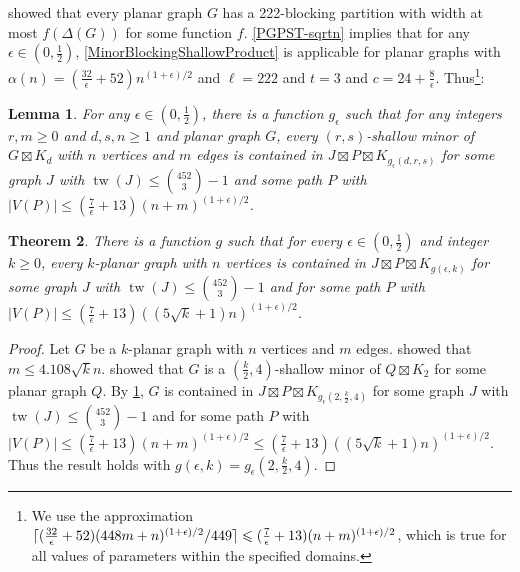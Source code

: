 \documentclass[11pt]{article}
\DeclarePairedDelimiter{\ceil}{\lceil}{\rceil}
\renewcommand{\geq}{\geqslant}
\renewcommand{\leq}{\leqslant}
\newcommand{\subsetsim}{\mathrel{\substack{\textstyle\subset\\[-0.3ex]\textstyle\sim\\[-0.4ex]}}}
\DeclareMathOperator{\tw}{tw}
\theoremstyle{plain}
\newtheorem{thm}{Theorem}
\newtheorem{lem}[thm]{Lemma}
\theoremstyle{definition}
\begin{document}

\citet[Lemma~3.1]{DHSW24} showed that every planar graph $G$ has a 222-blocking partition with width at most $f(\Delta(G))$ for some function $f$. \cref{PGPST-sqrtn} implies that for any $\epsilon\in (0,\frac12)$, \cref{MinorBlockingShallowProduct} is applicable for planar graphs with 
$\alpha(n)=(\frac{32}{\epsilon}+52) n^{(1+\epsilon)/2}$ and $\ell=222$ and $t=3$ and $c=24+\frac{8}{\epsilon}$. Thus\footnote{ We use the approximation $\ceil{ (\frac{32}{\epsilon}+52) (448m + n)^{(1+\epsilon)/2} /449 }\leq (\tfrac{7}{\epsilon}+13)(n+m)^{(1+\epsilon)/2}$, which is true for all values of parameters within the specified domains.}:

\begin{lem}
\label{PlanarBlockingShallowProduct}
For any $\epsilon\in (0,\frac12)$, there is a function $g_{\epsilon}$ such that for any  integers $r,m\geq 0$ and $d,s,n\geq 1$ and planar graph $G$, every $(r,s)$-shallow minor of $G\boxtimes K_{d}$ with $n$ vertices and $m$ edges is contained in $J \boxtimes P \boxtimes K_{g_{\epsilon}(d,r,s)}$ for some graph $J$ with $\tw(J)\leq \binom{452}{3}-1$ and some path $P$ with $|V(P)|\leq (\tfrac{7}{\epsilon}+13)(n+m)^{(1+\epsilon)/2}$. 
\end{lem}
		
\begin{thm}
There is a function $g$ such that for every $\epsilon\in(0,\tfrac12)$ and integer $k\geq 0$, every $k$-planar graph with $n$ vertices is contained in $J \boxtimes P \boxtimes K_{g(\epsilon,k)}$ for some graph $J$ with $\tw(J)\leq \binom{452}{3}-1$ and for some path $P$ with  $|V(P)|\leq  (\tfrac{7}{\epsilon}+13)((5\sqrt{k}+1)n)^{(1+\epsilon)/2}$.
\end{thm}
		
\begin{proof}
Let $G$ be a $k$-planar graph with $n$ vertices and $m$ edges.
\citet{PachToth97} showed that $m\leq  4.108\sqrt{k}n$. \citet{HW24} showed that $G$ is a $(\frac{k}{2},4)$-shallow minor of $Q\boxtimes K_2$ for some planar graph $Q$. By \cref{PlanarBlockingShallowProduct}, $G$ is contained in $J \boxtimes P \boxtimes K_{g_{\epsilon}(2,\frac{k}{2},4)}$ for some graph $J$ with $\tw(J)\leq \binom{452}{3}-1$ and for some path $P$ with  $|V(P)|\leq (\tfrac{7}{\epsilon}+13)(n+m)^{(1+\epsilon)/2}\leq (\tfrac{7}{\epsilon}+13)((5\sqrt{k}+1)n)^{(1+\epsilon)/2}$. Thus the result holds with $g(\epsilon,k)=g_{\epsilon}(2,\frac{k}{2},4)$.
\end{proof}
\end{document}
